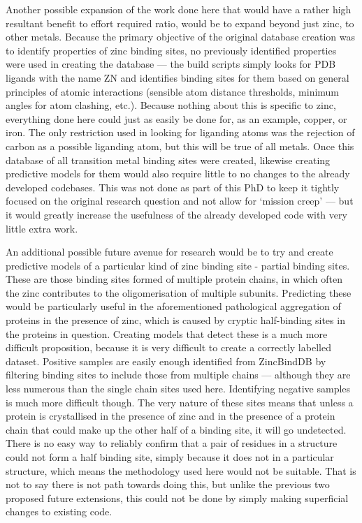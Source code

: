 Another possible expansion of the work done here that would have a rather high resultant benefit to effort required ratio, would be to expand beyond just zinc, to other metals. Because the primary objective of the original database creation was to identify properties of zinc binding sites, no previously identified properties were used in creating the database --- the build scripts simply looks for PDB ligands with the name ZN and identifies binding sites for them based on general principles of atomic interactions (sensible atom distance thresholds, minimum angles for atom clashing, etc.). Because nothing about this is specific to zinc, everything done here could just as easily be done for, as an example, copper, or iron. The only restriction used in looking for liganding atoms was the rejection of carbon as a possible liganding atom, but this will be true of all metals. Once this database of all transition metal binding sites were created, likewise creating predictive models for them would also require little to no changes to the already developed codebases. This was not done as part of this PhD to keep it tightly focused on the original research question and not allow for `mission creep' --- but it would greatly increase the usefulness of the already developed code with very little extra work.

An additional possible future avenue for research would be to try and create predictive models of a particular kind of zinc binding site - partial binding sites. These are those binding sites formed of multiple protein chains, in which often the zinc contributes to the oligomerisation of multiple subunits. Predicting these would be particularly useful in the aforementioned pathological aggregation of proteins in the presence of zinc, which is caused by cryptic half-binding sites in the proteins in question. Creating models that detect these is a much more difficult proposition, because it is very difficult to create a correctly labelled dataset. Positive samples are easily enough identified from ZincBindDB by filtering binding sites to include those from multiple chains --- although they are less numerous than the single chain sites used here. Identifying negative samples is much more difficult though. The very nature of these sites means that unless a protein is crystallised in the presence of zinc and in the presence of a protein chain that could make up the other half of a binding site, it will go undetected. There is no easy way to reliably confirm that a pair of residues in a structure could not form a half binding site, simply because it does not in a particular structure, which means the methodology used here would not be suitable. That is not to say there is not path towards doing this, but unlike the previous two proposed future extensions, this could not be done by simply making superficial changes to existing code.

